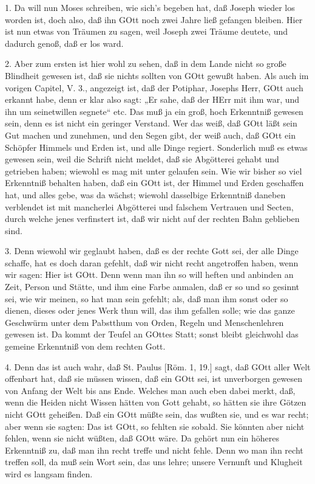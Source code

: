 1. Da will nun Moses schreiben, wie sich’s begeben hat, daß Joseph wieder los worden ist, doch also, daß ihn GOtt noch zwei Jahre ließ gefangen bleiben. Hier ist nun etwas von Träumen zu sagen, weil Joseph zwei Träume deutete, und dadurch genoß, daß er los ward.

2. Aber zum ersten ist hier wohl zu sehen, daß in dem Lande nicht so große Blindheit gewesen ist, daß sie nichts sollten von GOtt gewußt haben. Als auch im vorigen Capitel, V. 3., angezeigt ist, daß der Potiphar, Josephs Herr, GOtt auch erkannt habe, denn er klar also sagt: „Er sahe, daß der HErr mit ihm war, und ihn um seinetwillen segnete“ etc. Das muß ja ein groß, hoch Erkenntniß gewesen sein, denn es ist nicht ein geringer Verstand. Wer das weiß, daß GOtt läßt sein Gut machen und zunehmen, und den Segen gibt, der weiß auch, daß GOtt ein Schöpfer Himmels und Erden ist, und alle Dinge regiert. Sonderlich muß es etwas gewesen sein, weil die Schrift nicht meldet, daß sie Abgötterei gehabt und getrieben haben; wiewohl es mag mit unter gelaufen sein. Wie wir bisher so viel Erkenntniß behalten haben, daß ein GOtt ist, der Himmel und Erden geschaffen hat, und alles gebe, was da wächst; wiewohl dasselbige Erkenntniß daneben verblendet ist mit mancherlei Abgötterei und falschem Vertrauen und Secten, durch welche jenes verfinstert ist, daß wir nicht auf der rechten Bahn geblieben sind.

3. Denn wiewohl wir geglaubt haben, daß es der rechte Gott sei, der alle Dinge schaffe, hat es doch daran gefehlt, daß wir nicht recht angetroffen haben, wenn wir sagen: Hier ist GOtt. Denn wenn man ihn so will heften und anbinden an Zeit, Person und Stätte, und ihm eine Farbe anmalen, daß er so und so gesinnt sei, wie wir meinen, so hat man sein gefehlt; als, daß man ihm sonst oder so dienen, dieses oder jenes Werk thun will, das ihm gefallen solle; wie das ganze Geschwürm unter dem Pabstthum von Orden, Regeln und Menschenlehren gewesen ist. Da kommt der Teufel an GOttes Statt; sonst bleibt gleichwohl das gemeine Erkenntniß von dem rechten Gott.

4. Denn das ist auch wahr, daß St. Paulus [Röm. 1, 19.] sagt, daß GOtt aller Welt offenbart hat, daß sie müssen wissen, daß ein GOtt sei, ist unverborgen gewesen von Anfang der Welt bis ans Ende. Welches man auch eben dabei merkt, daß, wenn die Heiden nicht Wissen hätten von Gott gehabt, so hätten sie ihre Götzen nicht GOtt geheißen. Daß ein GOtt müßte sein, das wußten sie, und es war recht; aber wenn sie sagten: Das ist GOtt, so fehlten sie sobald. Sie könnten aber nicht fehlen, wenn sie nicht wüßten, daß GOtt wäre. Da gehört nun ein höheres Erkenntniß zu, daß man ihn recht treffe und nicht fehle. Denn wo man ihn recht treffen soll, da muß sein Wort sein, das uns lehre; unsere Vernunft und Klugheit wird es langsam finden.

